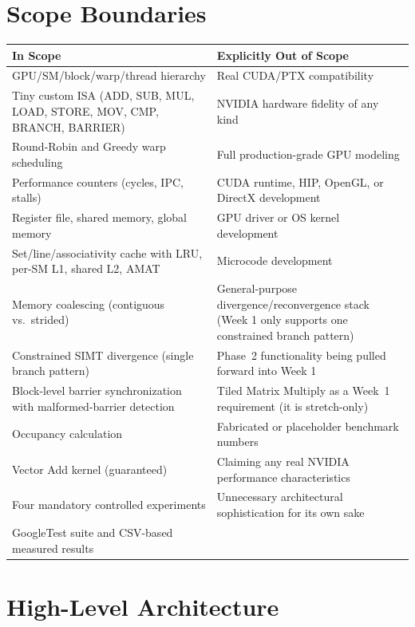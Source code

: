 \documentclass[11pt]{article}
\begin{document}
\section{Scope Boundaries}

\begin{longtable}{@{}p{7cm}p{7.5cm}@{}}
\toprule
\textbf{In Scope} & \textbf{Explicitly Out of Scope} \\
\midrule
\endhead
GPU/SM/block/warp/thread hierarchy & Real CUDA/PTX compatibility \\
Tiny custom ISA (ADD, SUB, MUL, LOAD, STORE, MOV, CMP, BRANCH, BARRIER) &
NVIDIA hardware fidelity of any kind \\
Round-Robin and Greedy warp scheduling & Full production-grade GPU
modeling \\
Performance counters (cycles, IPC, stalls) & CUDA runtime, HIP, OpenGL, or
DirectX development \\
Register file, shared memory, global memory & GPU driver or OS kernel
development \\
Set/line/associativity cache with LRU, per-SM L1, shared L2, AMAT &
Microcode development \\
Memory coalescing (contiguous vs.\ strided) & General-purpose
divergence/reconvergence stack (Week 1 only supports one constrained
branch pattern) \\
Constrained SIMT divergence (single branch pattern) & Phase~2
functionality being pulled forward into Week 1 \\
Block-level barrier synchronization with malformed-barrier detection &
Tiled Matrix Multiply as a Week~1 requirement (it is stretch-only) \\
Occupancy calculation & Fabricated or placeholder benchmark numbers \\
Vector Add kernel (guaranteed) & Claiming any real NVIDIA performance
characteristics \\
Four mandatory controlled experiments & Unnecessary architectural
sophistication for its own sake \\
GoogleTest suite and CSV-based measured results & \\
\bottomrule
\end{longtable}

\section{High-Level Architecture}
\end{document}
